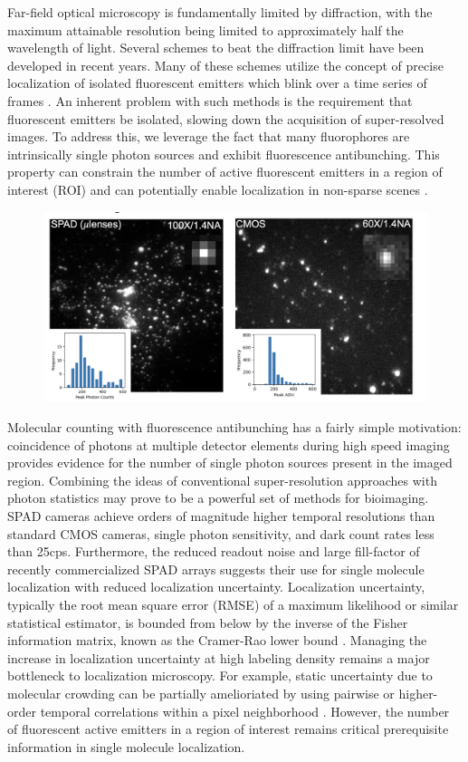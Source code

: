 Far-field optical microscopy is fundamentally limited by diffraction, with the maximum attainable resolution being limited to approximately half the wavelength of light. Several schemes to beat the diffraction limit have been developed in recent years. Many of these schemes utilize the concept of precise localization of isolated fluorescent emitters which blink over a time series of frames \parencite{Rust2006,Betzig2006}. An inherent problem with such methods is the requirement that fluorescent emitters be isolated, slowing down the acquisition of super-resolved images. To address this, we leverage the fact that many fluorophores are intrinsically single photon sources and exhibit fluorescence antibunching. This property can constrain the number of active fluorescent emitters in a region of interest (ROI) and can potentially enable localization in non-sparse scenes \parencite{Ta2010,Israel2017}. 

\begin{figure}[t]
\centering
\includegraphics[width=12cm]{media/SPADvCMOS.png}
\caption{}
\end{figure}    

Molecular counting with fluorescence antibunching has a fairly simple motivation: coincidence of photons at multiple detector elements during high speed imaging provides evidence for the number of single photon sources present in the imaged region. Combining the ideas of conventional super-resolution approaches with photon statistics may prove to be a powerful set of methods for bioimaging. SPAD cameras achieve orders of magnitude higher temporal resolutions than standard CMOS cameras, single photon sensitivity, and dark count rates less than 25cps. Furthermore, the reduced readout noise and large fill-factor of recently commercialized SPAD arrays suggests their use for single molecule localization with reduced localization uncertainty. Localization uncertainty, typically the root mean square error (RMSE) of a maximum likelihood or similar statistical estimator, is bounded from below by the inverse of the Fisher information matrix, known as the Cramer-Rao lower bound \parencite{Chao2016}. Managing the increase in localization uncertainty at high labeling density remains a major bottleneck to localization microscopy. For example, static uncertainty due to molecular crowding can be partially amelioriated by using pairwise or higher-order temporal correlations within a pixel neighborhood \parencite{Dertinger2009}. However, the number of fluorescent active emitters in a region of interest remains critical prerequisite information in single molecule localization.

